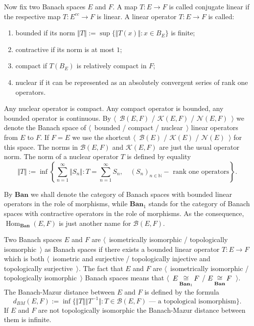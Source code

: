 Now fix two Banach spaces $E$ and $F$. A map $T:E\to F$ is called conjugate
linear if the respective map $T:E^{cc}\to F$ is linear. A linear operator
$T:E\to F$ is called:
\begin{enumerate}[label = (\roman*)]
  \item bounded if its norm $\Vert T\Vert:=\sup \{\Vert T(x)\Vert:x\in B_E \}$ 
  is finite;

  \item contractive if its norm is at most $1$;

  \item compact if $T(B_E)$ is relatively compact in $F$;

  \item nuclear if it can be represented as an absolutely convergent series of
  rank one operators.
\end{enumerate}

Any nuclear operator is compact. Any compact operator is
bounded, any bounded operator is continuous. By $\langle$~$\mathcal{B}(E,F)$ /
$\mathcal{K}(E,F)$ / $\mathcal{N}(E,F)$~$\rangle$ we denote the Banach space of
$\langle$~bounded / compact / nuclear~$\rangle$ linear operators from $E$ to
$F$. If $F=E$ we use the shortcut $\langle$~$\mathcal{B}(E)$ / $\mathcal{K}(E)$
/ $\mathcal{N}(E)$~$\rangle$ for this space. The norms in $\mathcal{B}(E,F)$ and
$\mathcal{K}(E,F)$ are just the usual operator norm. The norm of a nuclear
operator $T$ is defined by equality
$$
\Vert T\Vert
:=\inf\left \{
  \sum_{n=1}^\infty\Vert S_n\Vert
  :T=\sum_{n=1}^\infty S_n,\quad 
  {(S_n)}_{n\in\mathbb{N}} - \mbox{ rank one operators}
\right \}.
$$

By $\mathbf{Ban}$ we shall denote the category of Banach spaces with bounded
linear operators in the role of morphisms, while $\mathbf{Ban}_1$ stands for the
category of Banach spaces with contractive operators in the role of morphisms.
As the consequence, $\operatorname{Hom}_{\mathbf{Ban}}(E,F)$ is just another
name for $\mathcal{B}(E,F)$.

Two Banach spaces $E$ and $F$ are $\langle$~isometrically isomorphic /
topologically isomorphic~$\rangle$ as Banach spaces if there exists a bounded
linear operator $T:E\to F$ which is both $\langle$~isometric and surjective /
topologically injective and topologically surjective~$\rangle$. The fact that
$E$ and $F$ are $\langle$~isometrically isomorphic / topologically
isomorphic~$\rangle$ Banach spaces means that
$\langle$~$E\mathop{\mathbin{\cong}}\limits_{\mathbf{Ban}_1}F$ / $E\mathop{\mathbin{\cong}}\limits_{\mathbf{Ban}}F$~$\rangle$. The
Banach-Mazur distance between $E$ and $F$ is defined by the formula 
$$
d_{BM}(E,F):=\inf \{
  \Vert T\Vert\Vert T^{-1}\Vert
  :T \in \mathcal{B}(E,F) \mbox{ --- a topological isomorphism}
 \}.
$$ 
If $E$ and $F$ are not topologically isomorphic the Banach-Mazur distance
between them is infinite.



